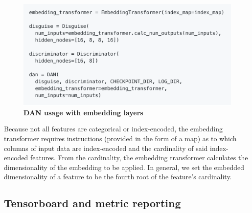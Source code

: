 \documentclass{proc}
\begin{document}
\begin{figure}[h!]
		\includegraphics*[scale=0.45]{../figures/dan-usage-embeddings.png}
		\caption{\textbf{DAN usage with embedding layers}}
		\label{fig:dan-usage-embeddings}
\end{figure}

Because not all features are categorical or index-encoded, the embedding transformer requires instructions (provided in the form of a map) as to which columns of input data are index-encoded and the cardinality of said index-encoded features. From the cardinality, the embedding transformer calculates the dimensionality of the embedding to be applied. In general, we set the embedded dimensionality of a feature to be the fourth root of the feature's cardinality.

\subsection{Tensorboard and metric reporting}
\end{document}
